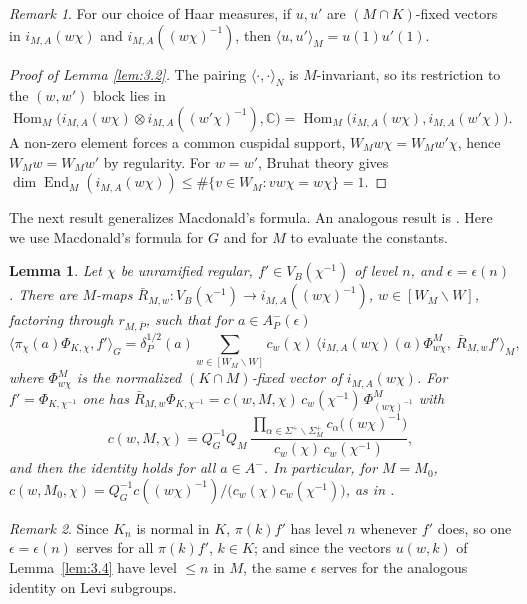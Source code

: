 \documentclass[12pt,letterpaper]{article}
\numberwithin{equation}{section}
\theoremstyle{plain}
\newtheorem{lemma}{Lemma}[section]
\theoremstyle{remark}
\newtheorem{remarkold}{Remark}%
\theoremstyle{plain}
\theoremstyle{definition}
\theoremstyle{remark}
\theoremstyle{remark}
\newcommand{\ip}[1]{\langle #1\rangle}
\DeclareMathOperator{\Hom}{Hom}
\DeclareMathOperator{\End}{End}
\newcommand{\Wrep}[1]{[W_{#1}\backslash W]}
\begin{document}
\begin{remarkold}\label{rem:3}
For our choice of Haar measures, if $u,u'$ are $(M\cap K)$-fixed vectors in $i_{M,A}(w\chi)$ and $i_{M,A}((w\chi)^{-1})$, then $\ip{u,u'}_M=u(1)u'(1)$.
\end{remarkold}

\begin{proof}[Proof of Lemma \ref{lem:3.2}]
The pairing $\ip{\cdot,\cdot}_N$ is $M$-invariant, so its restriction to the $(w,w')$ block lies in $\Hom_M\big(i_{M,A}(w\chi)\otimes i_{M,A}((w'\chi)^{-1}),\mathbb{C}\big)=\Hom_M\big(i_{M,A}(w\chi),i_{M,A}(w'\chi)\big)$. A non-zero element forces a common cuspidal support, $W_Mw\chi=W_Mw'\chi$, hence $W_Mw=W_Mw'$ by regularity. For $w=w'$, Bruhat theory gives $\dim\End_M(i_{M,A}(w\chi))\le\#\{v\in W_M:vw\chi=w\chi\}=1$.
\end{proof}

The next result generalizes Macdonald's formula. An analogous result is \cite[Lemma~I.3.1]{Wa89a}. Here we use Macdonald's formula for $G$ and for $M$ to evaluate the constants.

\begin{lemma}\label{lem:3.3}
Let $\chi$ be unramified regular, $f'\in V_B(\chi^{-1})$ of level $n$, and $\epsilon=\epsilon(n)$. There are $M$-maps $\bar R_{M,w}:V_B(\chi^{-1})\to i_{M,A}((w\chi)^{-1})$, $w\in\Wrep{M}$, factoring through $r_{M,\bar P}$, such that for $a\in A^-_P(\epsilon)$
\[
\ip{\pi_\chi(a)\Phi_{K,\chi},f'}_G=\delta_P^{1/2}(a)\sum_{w\in\Wrep{M}}c_w(\chi)\,\ip{i_{M,A}(w\chi)(a)\Phi^M_{w\chi},\ \bar R_{M,w}f'}_M,
\]
where $\Phi^M_{w\chi}$ is the normalized $(K\cap M)$-fixed vector of $i_{M,A}(w\chi)$. For $f'=\Phi_{K,\chi^{-1}}$ one has $\bar R_{M,w}\Phi_{K,\chi^{-1}}=c(w,M,\chi)\,c_w(\chi^{-1})\,\Phi^M_{(w\chi)^{-1}}$ with
\[
c(w,M,\chi)=Q_G^{-1}Q_M\,\frac{\prod_{\alpha\in\Sigma^+\smallsetminus\Sigma_M^+}c_\alpha\big((w\chi)^{-1}\big)}{c_w(\chi)\,c_w(\chi^{-1})},
\]
and then the identity holds for all $a\in A^-$. In particular, for $M=M_0$, $c(w,M_0,\chi)=Q_G^{-1}c((w\chi)^{-1})/\big(c_w(\chi)c_w(\chi^{-1})\big)$, as in \cite{Ma71}.
\end{lemma}

\begin{remarkold}\label{rem:4}
Since $K_n$ is normal in $K$, $\pi(k)f'$ has level $n$ whenever $f'$ does, so one $\epsilon=\epsilon(n)$ serves for all $\pi(k)f'$, $k\in K$; and since the vectors $u(w,k)$ of Lemma~\ref{lem:3.4} have level $\le n$ in $M$, the same $\epsilon$ serves for the analogous identity on Levi subgroups.
\end{remarkold}
\end{document}
